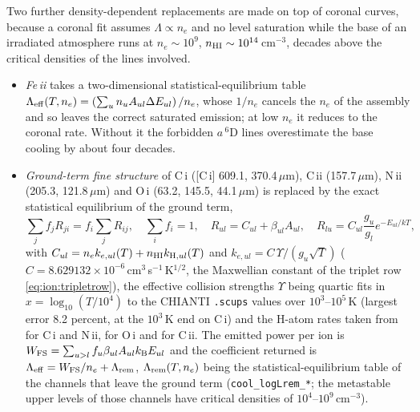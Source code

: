 Two further density-dependent replacements are made on top of coronal curves,
because a coronal fit assumes $\Lambda\propto n_e$ and no level saturation
while the base of an irradiated atmosphere runs at $n_e\sim10^{9}$,
$n_{\rm HI}\sim10^{14}$\,cm$^{-3}$, decades above the critical densities of
the lines involved.

\begin{itemize}
\item \emph{Fe\,{\sc ii}} takes a two-dimensional statistical-equilibrium
  table $\Lambda_{\rm eff}(T,n_e) = \left(\sum_u n_u A_{ul}\Delta E_{ul}\right)/n_e$,
  whose $1/n_e$ cancels the $n_e$ of the assembly and so leaves the correct
  saturated emission; at low $n_e$ it reduces to the coronal rate. Without
  it the forbidden $a\,^6$D lines overestimate the base cooling by about
  four decades.
\item \emph{Ground-term fine structure} of C\,{\sc i} ([C\,{\sc i}] 609.1,
  370.4\,$\mu$m), C\,{\sc ii} (157.7\,$\mu$m), N\,{\sc ii} (205.3,
  121.8\,$\mu$m) and O\,{\sc i} (63.2, 145.5, 44.1\,$\mu$m) is replaced by
  the exact statistical equilibrium of the ground term,
  \begin{equation}
  \sum_j f_j R_{ji} = f_i\sum_j R_{ij},
  \quad \sum_i f_i = 1,
  \quad R_{ul} = C_{ul}+\beta_{ul}A_{ul},
  \quad R_{lu} = C_{ul}\frac{g_u}{g_l}e^{-E_{ul}/kT},
  \label{eq:th:fsse}
  \end{equation}
  with $C_{ul} = n_e k_{e,ul}(T)+n_{\rm HI}k_{{\rm H},ul}(T)$ and
  $k_{e,ul} = C\,\Upsilon/(g_u\sqrt T)$ ($C = 8.629132\times10^{-6}$\,cm$^3$\,s$^{-1}$\,K$^{1/2}$, the Maxwellian constant of the triplet row \eqref{eq:ion:tripletrow}), the effective
  collision strengths $\Upsilon$ being quartic fits in
  $x = \log_{10}(T/10^{4})$ to the CHIANTI \texttt{.scups} values over
  $10^{3}$--$10^{5}$\,K (largest error 8.2 percent, at the $10^3$\,K end on
  C\,{\sc i}) and the H-atom rates
  taken from \citet{YanBabb2023} for C\,{\sc i} and N\,{\sc ii},
  \citet{Abrahamsson2007} for O\,{\sc i} and \citet{Barinovs2005} for
  C\,{\sc ii}. The
  emitted power per ion is
  $W_{\rm FS} = \sum_{u>l} f_u\beta_{ul}A_{ul}k_{\rm B}E_{ul}$ and the
  coefficient returned is $\Lambda_{\rm eff} = W_{\rm FS}/n_e+\Lambda_{\rm rem}$,
  $\Lambda_{\rm rem}(T,n_e)$ being the statistical-equilibrium table of the
  channels that leave the ground term (\texttt{cool\_logLrem\_*}; the
  metastable upper levels of those channels have critical densities of
  $10^{4}$--$10^{9}$\,cm$^{-3}$).
\end{itemize}

